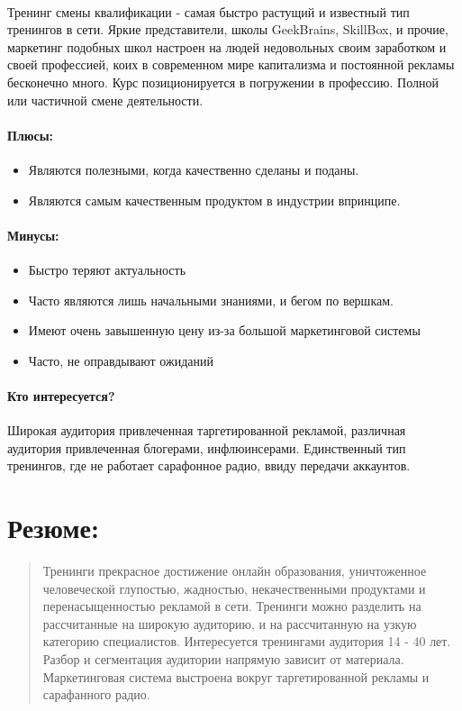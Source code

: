 \documentclass{article}
\begin{document}
\paragraph{}
Тренинг смены квалификации - самая быстро растущий и известный тип тренингов в сети. Яркие представители, школы GeekBrains, SkillBox, и прочие, маркетинг подобных школ настроен на людей недовольных своим заработком и своей профессией, коих в современном мире капитализма и постоянной рекламы бесконечно много. Курс позиционируется в погружении в профессию. Полной или частичной смене деятельности. 
\paragraph{\textbf{Плюсы:}}
\begin{itemize}
    \item Являются полезными, когда качественно сделаны и поданы.
    \item Являются самым качественным продуктом в индустрии впринципе.
\end{itemize}
\paragraph{\textbf{Минусы:}}
\begin{itemize}
    \item Быстро теряют актуальность
    \item Часто являются лишь начальными знаниями, и бегом по вершкам. 
    \item Имеют очень завышенную цену из-за большой маркетинговой системы
    \item Часто, не оправдывают ожиданий
\end{itemize}
\paragraph{\textbf{Кто интересуется?}}
Широкая аудитория привлеченная таргетированной рекламой, различная аудитория привлеченная блогерами, инфлюинсерами. Единственный тип тренингов, где не работает сарафонное радио, ввиду передачи аккаунтов. 




\section{Резюме:}
\begin{quote}
    Тренинги прекрасное достижение онлайн образования, уничтоженное человеческой глупостью, жадностью, некачественными продуктами и перенасыщенностью рекламой в сети. Тренинги можно разделить на рассчитанные на широкую аудиторию, и на рассчитанную на узкую категорию специалистов. Интересуется тренингами аудитория 14 - 40 лет. Разбор и сегментация аудитории напрямую зависит от материала. Маркетинговая система выстроена вокруг таргетированной рекламы и сарафанного радио. 
\end{quote}
\end{document}
